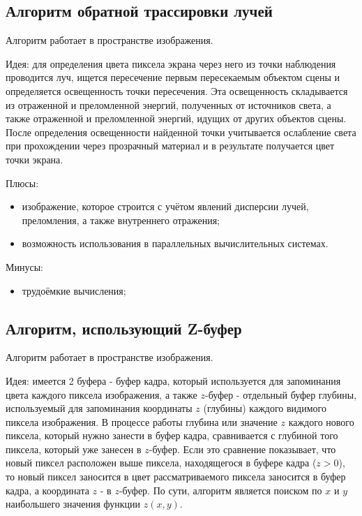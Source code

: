 \subsection{Алгоритм обратной трассировки лучей}
Алгоритм работает в пространстве изображения\cite{raytr}.

Идея: для определения цвета пиксела экрана через него из точки наблюдения проводится луч, ищется пересечение первым пересекаемым объектом сцены и определяется освещенность точки пересечения. Эта освещенность складывается из отраженной и преломленной энергий, полученных от источников света, а также отраженной и преломленной энергий, идущих от других объектов сцены. После определения освещенности найденной точки учитывается ослабление света при прохождении через прозрачный материал и в результате получается цвет точки экрана.

Плюсы:
\begin{itemize}
    \item изображение, которое строится с учётом явлений дисперсии лучей, преломления, а также внутреннего отражения;
    \item возможность использования в параллельных вычислительных системах.
\end{itemize}

Минусы:
\begin{itemize}
    \item трудоёмкие вычисления\cite{tracer_proof};
\end{itemize}

\subsection{Алгоритм, использующий Z-буфер}
Алгоритм работает в пространстве изображения\cite{zbuf}.

Идея: имеется 2 буфера - буфер кадра, который используется для запоминания цвета каждого пиксела изображения, а также $z$-буфер - отдельный буфер глубины, используемый для запоминания координаты $z$ (глубины) каждого видимого пиксела изображения. В процессе работы глубина или значение $z$ каждого нового пиксела, который нужно занести в буфер кадра, сравнивается с глубиной того пиксела, который уже занесен в $z$-буфер. Если это сравнение показывает, что новый пиксел расположен выше пиксела, находящегося в буфере кадра ($z > 0$), то новый пиксел заносится в цвет рассматриваемого пиксела заносится в буфер кадра, а координата $z$ - в $z$-буфер. По сути, алгоритм является поиском по $x$ и $y$ наибольшего значения функции $z(x, y)$.

